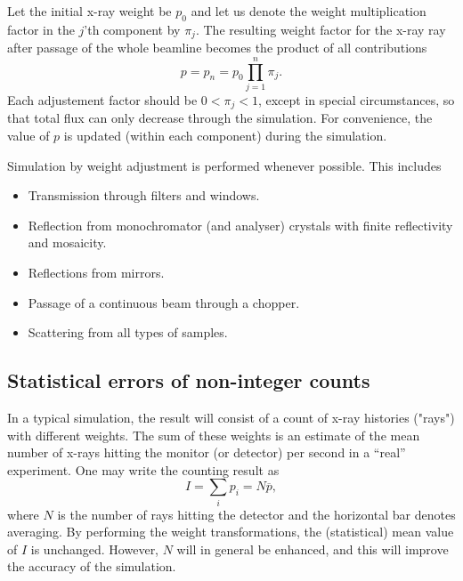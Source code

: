 Let the initial x-ray weight be $p_0$ and let us denote the weight
multiplication factor in the $j$'th component by $\pi_j$.  The resulting
weight factor for the x-ray ray after passage of the whole beamline
becomes the product of all contributions
\begin{equation}
\label{e:probprod}
p = p_n = p_0 \prod_{j=1}^n \pi_j .
\end{equation}
Each adjustement factor should be $0 < \pi_j < 1$, except in special
circumstances, so that total flux can only decrease through the simulation. For
convenience, the value of $p$ is updated (within each component)
during the simulation.

Simulation by weight adjustment is performed
whenever possible. This includes
\begin{itemize}
\item Transmission through filters and windows.
\item Reflection from monochromator (and analyser) crystals
 with finite reflectivity and mosaicity.
\item Reflections from mirrors.
\item Passage of a continuous beam through a chopper.
\item Scattering from all types of samples.
\end{itemize}

\subsection{Statistical errors of non-integer counts}
\label{s:staterror}
In a typical simulation, the result will consist of a
count of x-ray histories ("rays") with different weights. The
sum of these weights is an estimate of the mean number of x-rays
hitting the monitor (or detector) per second in a ``real'' experiment.
One may write the counting result as
\begin{equation}
\label{psum}
I = \sum_i p_i = N \overline{p} ,
\end{equation}
where $N$ is the number of rays hitting the detector and the horizontal bar
denotes averaging.
By performing the weight transformations, the (statistical)
mean value of $I$ is unchanged. However, $N$ will in general be enhanced,
and this will improve the accuracy of the simulation.

